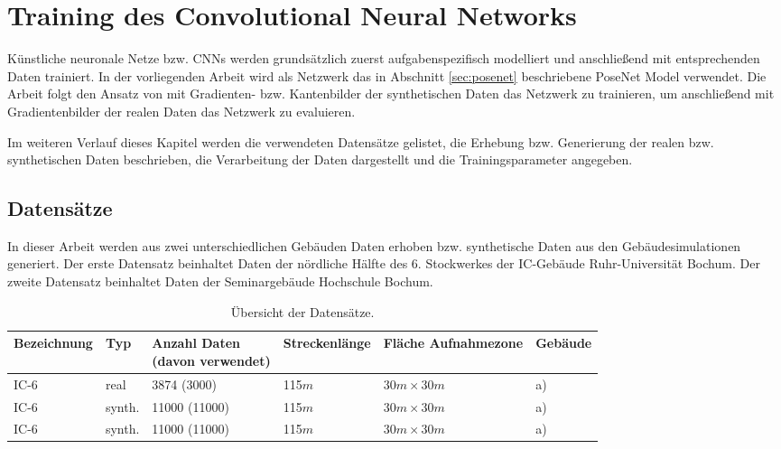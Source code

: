 
\section{Training des Convolutional Neural Networks}
Künstliche neuronale Netze bzw. CNNs werden grundsätzlich zuerst aufgabenspezifisch modelliert und anschließend mit entsprechenden Daten trainiert.  In der vorliegenden Arbeit wird als Netzwerk das in Abschnitt \ref{sec:posenet} beschriebene PoseNet Model verwendet. Die Arbeit folgt den Ansatz von \citet{acharyaBIMPoseNetIndoorCamera2019} mit Gradienten- bzw. Kantenbilder der synthetischen Daten das Netzwerk zu trainieren, um anschließend mit Gradientenbilder der realen Daten das Netzwerk zu evaluieren. 

Im weiteren Verlauf dieses Kapitel werden die verwendeten Datensätze gelistet, die Erhebung bzw. Generierung der realen bzw. synthetischen Daten beschrieben, die Verarbeitung der Daten dargestellt und die Trainingsparameter angegeben. 


\subsection{Datensätze}
\label{subsec:datasets}
In dieser Arbeit werden aus zwei unterschiedlichen Gebäuden Daten erhoben bzw. synthetische Daten aus den Gebäudesimulationen generiert. 
Der erste Datensatz beinhaltet Daten der nördliche Hälfte des 6. Stockwerkes der IC-Gebäude Ruhr-Universität Bochum. Der zweite Datensatz beinhaltet Daten der Seminargebäude Hochschule Bochum.


\begin{table}[H]
	\centering
	\caption{Übersicht der Datensätze.}
	\begin{tabularx}{1.0\textwidth}{l l l p{1.7cm} p{2.5cm} l}
		\textbf{Bezeichnung} & \textbf{Typ} & \makecell[tl]{\textbf{Anzahl Daten}  \\ (davon verwendet)} & \textbf{Strecken\-länge} & \textbf{Fläche Auf\-nahmezone} & \textbf{Gebäude}\\
		\hline
		IC-6 & real & 3874 (3000)& 115$m$ & $30m \times 30m$ & a) \\
		\hline
		IC-6 & synth. & 11000 (11000)& 115$m$ & $30m \times 30m$ & a)\\
		\hline
		IC-6 & synth. & 11000 (11000)& 115$m$ & $30m \times 30m$ & a)\\
	\end{tabularx}
	\label{tab:trainingparams}
\end{table}


